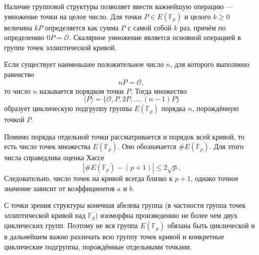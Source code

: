 Наличие групповой структуры позволяет ввести важнейшую операцию --- умножение точки на целое число. Для точки $P\in E(\mathbb{F}_p)$ и целого $k\ge 0$ величина $kP$ определяется как сумма $P$ с самой собой $k$ раз, причём по определению $0P=\mathcal{O}$. Скалярное умножение является основной операцией в группе точек эллиптической кривой.

Если существует наименьшее положительное число $n$, для которого выполнено равенство
\[
nP=\mathcal{O},
\]
то число $n$ называется порядком точки $P$. Тогда множество
\[
\langle P\rangle=\{\mathcal{O},P,2P,\dots,(n-1)P\}
\]
образует циклическую подгруппу группы $E(\mathbb{F}_p)$ порядка $n$, порождённую точкой $P$.

Помимо порядка отдельной точки рассматривается и порядок всей кривой, то есть число точек множества $E(\mathbb{F}_p)$. Оно обозначается $\#E(\mathbb{F}_p)$. Для этого числа справедлива оценка Хассе
\[
\left|\#E(\mathbb{F}_p)-(p+1)\right|\le 2\sqrt{p}.
\]
Следовательно, число точек на кривой всегда близко к $p+1$, однако точное значение зависит от коэффициентов $a$ и $b$.

С точки зрения структуры конечная абелева группа (в частности группа точек эллиптической кривой над $\mathbb{F}_p$) изоморфна произведению не более чем двух циклических групп. Поэтому не вся группа $E(\mathbb{F}_p)$ обязана быть циклической и в дальнейшем важно различать всю группу точек кривой и конкретные циклические подгруппы, порождённые отдельными точками.